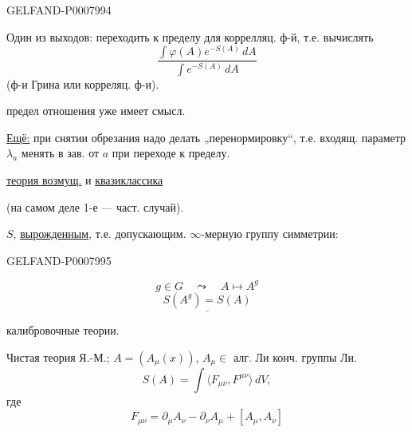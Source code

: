 \begin{GelfandAdjacentEvidence}{GELFAND-P000799}{4}


Один из выходов: переходить к пределу для коррелляц. ф-й, т.е. вычислять
\begin{equation*}
\frac{\int\varphi(A)e^{-S(A)}\,dA}{\int e^{-S(A)}\,dA}
\tag{2}
\end{equation*}
(ф-и Грина или корреляц. ф-и).

 предел отношения уже имеет смысл.

\underline{Ещё:} при снятии обрезания надо делать „перенормировку“, т.е. входящ. параметр \(\lambda_a\) менять в зав. от \(a\) при переходе к пределу.


\underline{теория возмущ.} и \underline{квазиклассика}

(на самом деле 1-е --- част. случай).

 \(S\), 
\underline{\underline{вырожденным}},
т.е. допускающим. \(\infty\)-мерную группу симметрии:
\end{GelfandAdjacentEvidence}
\begin{GelfandAdjacentEvidence}{GELFAND-P000799}{5}

\[
g\in G\quad\leadsto\quad A\mapsto A^g
\]
\begin{equation*}
\underline{S(A^g)=S(A)}
\tag{3}
\end{equation*}

 калибровочные теории.

Чистая теория Я.-М.; \(A=(A_\mu(x))\), \(A_\mu\in\) алг. Ли конч. группы Ли.
\begin{equation*}
S(A)=\int\langle F_{\mu\nu},F^{\mu\nu}\rangle\,dV,
\tag{4}
\end{equation*}
где
\begin{equation*}
F_{\mu\nu}=\partial_\mu A_\nu-\partial_\nu A_\mu+[A_\mu,A_\nu]
\tag{5}
\end{equation*}
\end{GelfandAdjacentEvidence}



